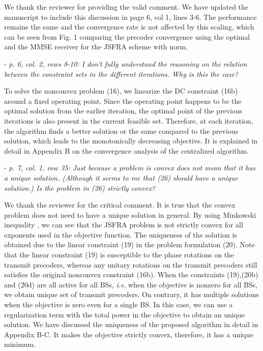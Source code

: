 \begin{itemize}
\begin{itemize}
\resp We thank the reviewer for providing the valid comment. We have updated the manuscript to include this discussion in page 6, col 1, lines 3-6. The performance remains the same and the convergence rate is not affected by this scaling, which can be seen from Fig. 1 comparing the precoder convergence using the optimal and the MMSE receiver for the JSFRA scheme with  norm.

 - \textit{p. 6, col. 2, rows 8-10: I don't fully understand the reasoning on the relation between the constraint sets in the different iterations. Why is this the case?}

\resp To solve the nonconvex problem (16), we linearize the DC constraint (16b) around a fixed operating point. Since the operating point happens to be the optimal solution from the earlier iteration, the optimal point of the previous iterations is also present in the current feasible set. Therefore, at each iteration, the algorithm finds a better solution or the same compared to the previous solution, which leads to the monotonically decreasing objective. It is explained in detail in Appendix B on the convergence analysis of the centralized algorithm.

 - \textit{p. 7, col. 1, row 35: Just because a problem is convex does not mean that it has a unique solution. (Although it seems to me that (26) should have a unique solution.) Is the problem in (26) strictly convex?}

\resp We thank the reviewer for the critical comment. It is true that the convex problem does not need to have a unique solution in general. By using Minkowski inequality , we can see that the JSFRA problem is not strictly convex for all exponents  used in the objective function. The uniqueness of the solution is obtained due to the linear constraint (19) in the problem formulation (20). Note that the linear constraint (19) is susceptible to the phase rotations on the transmit precoders, whereas any unitary rotations on the transmit precoders still satisfies the original nonconvex constraint (16b). When the constraints (19),(20b) and (20d) are all active for all BSs, \textit{i.e}, when the objective is nonzero for all BSs, we obtain unique set of transmit precoders. On contrary, it has multiple solutions when the objective is zero even for a single BS. In this case, we can use a regularization term with the total power in the objective to obtain an unique solution. We have discussed the uniqueness of the proposed algorithm in detail in Appendix B-C. It makes the objective strictly convex, therefore, it has a unique minimum.


\end{itemize}
\end{itemize}
